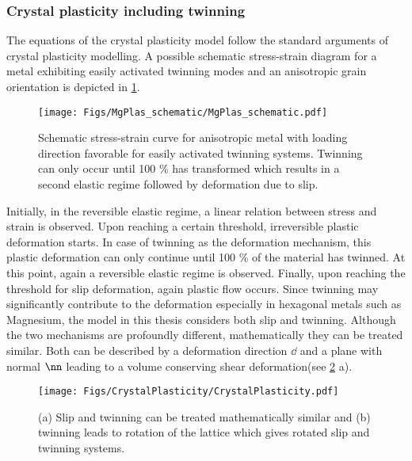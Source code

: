 \subsubsection{Crystal plasticity including twinning}
The equations of the crystal plasticity model follow the standard arguments of crystal plasticity\supercite{roters_crystal_2010} modelling. A possible schematic stress-strain diagram for a metal exhibiting easily activated twinning modes and an anisotropic grain orientation is depicted in \cref{fig:MgPlas}.
\begin{figure}[h!]
  \centering
  \texttt{[image: Figs/MgPlas\_schematic/MgPlas\_schematic.pdf]}
  \caption{Schematic stress-strain curve for anisotropic metal with loading direction favorable for easily activated twinning systems. Twinning can only occur until 100 \% has transformed which results in a second elastic regime followed by deformation due to slip. }
  \label{fig:MgPlas}
\end{figure}

Initially, in the reversible elastic regime, a linear relation between stress and strain is observed. Upon reaching a certain threshold, irreversible plastic deformation starts. In case of twinning as the deformation mechanism, this plastic deformation can only continue until 100 \% of the material has twinned. At this point, again a reversible elastic regime is observed. Finally, upon reaching the threshold for slip deformation, again plastic flow occurs. Since twinning may significantly contribute to the deformation especially in hexagonal metals such as Magnesium, the model in this thesis considers both slip and twinning. Although the two mechanisms are profoundly different, mathematically they can be treated similar. Both can be described by a deformation direction $\dd$ and a plane with normal $\nn$ leading to a volume conserving shear deformation(see \cref{fig:CrystalPlasticity} a). 
\begin{figure}[h!]
  \centering
  \texttt{[image: Figs/CrystalPlasticity/CrystalPlasticity.pdf]}
  \caption{(a) Slip and twinning can be treated mathematically similar and (b) twinning leads to rotation of the lattice which gives rotated slip and twinning systems.}
  \label{fig:CrystalPlasticity}
\end{figure}

